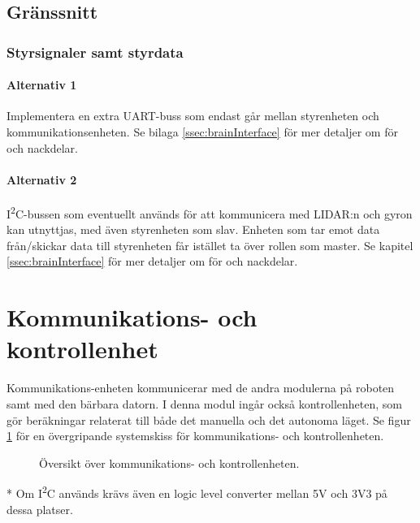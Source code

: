 \documentclass[a4paper,11pt]{article}
\begin{document}
\subsection{Gränssnitt} \label{ssec:controllInterface}

\subsubsection{Styrsignaler samt styrdata}

\paragraph{Alternativ 1}
Implementera en extra UART-buss som endast går mellan styrenheten och kommunikationsenheten. Se bilaga  \ref{ssec:brainInterface} för mer detaljer om för och nackdelar.

\paragraph{Alternativ 2}
I\textsuperscript{2}C-bussen som eventuellt används för att kommunicera med LIDAR:n och gyron kan utnyttjas, med även styrenheten som slav. Enheten som tar emot data från/skickar data till styrenheten får istället ta över rollen som master. Se kapitel \ref{ssec:brainInterface} för mer detaljer om för och nackdelar.

\newpage
\section{Kommunikations- och kontrollenhet} \label{sec:system3}
Kommunikations-enheten kommunicerar med de andra modulerna på roboten samt med den bärbara datorn. I denna modul ingår också kontrollenheten, som gör beräkningar relaterat till både det manuella och det autonoma läget. Se figur \ref{fig:unitBrain} för en övergripande systemskiss för kommunikations- och kontrollenheten.
\begin{figure}[h!]
    \caption{Översikt över kommunikations- och kontrollenheten.  }
    \label{fig:unitBrain}
\end{figure}
\noindent \begin{small}
* Om I\textsuperscript{2}C används krävs även en logic level converter mellan 5V och 3V3 på dessa platser.
\end{small}
\end{document}
